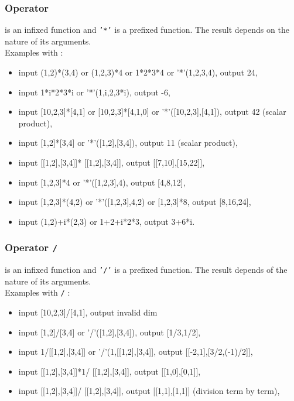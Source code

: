 \documentclass[a4paper,11pt]{book}
\begin{document}
\subsubsection{Operator {\tt *}}\index{*}
\noindent{\tt *} is an infixed function and {\tt '*'} 
is a prefixed function. The result depends on the nature of its arguments.\\
Examples with {\tt *} :
\begin{itemize}
\item input (1,2)*(3,4) or (1,2,3)*4 or 1*2*3*4  or '*'(1,2,3,4), output 24,
\item  input 1*i*2*3*i or '*'(1,i,2,3*i), output -6,
\item  input [10,2,3]*[4,1] or [10,2,3]*[4,1,0] or '*'([10,2,3],[4,1]), 
output 42 (scalar product),
\item  input [1,2]*[3,4] or '*'([1,2],[3,4]), output 11 (scalar product),
\item  input [[1,2],[3,4]]* [[1,2],[3,4]], output [[7,10],[15,22]],
\item  input [1,2,3]*4 or '*'([1,2,3],4), output [4,8,12],
\item  input [1,2,3]*(4,2) or '*'([1,2,3],4,2) or [1,2,3]*8, output [8,16,24],
\item  input (1,2)+i*(2,3) or 1+2+i*2*3, output 3+6*i.
\end{itemize}

\subsubsection{Operator {\tt /}}\index{/}
\noindent{\tt /} is an infixed function and {\tt '/'} 
is a prefixed function. The result depends of the nature of its arguments.\\
Examples with {\tt /} :
\begin{itemize}
\item input [10,2,3]/[4,1], output invalid dim
\item input [1,2]/[3,4] or '/'([1,2],[3,4]), output [1/3,1/2], 
\item input 1/[[1,2],[3,4]] or '/'(1,[[1,2],[3,4]], output 
[[-2,1],[3/2,(-1)/2]],
\item input [[1,2],[3,4]]*1/ [[1,2],[3,4]], output [[1,0],[0,1]],
\item input [[1,2],[3,4]]/ [[1,2],[3,4]], output [[1,1],[1,1]] (division term 
by term),
\end{itemize}
\end{document}

